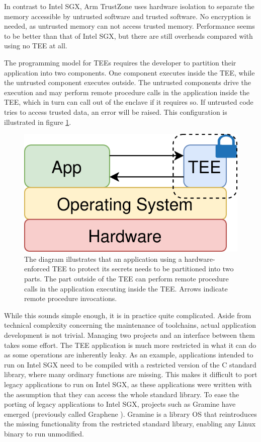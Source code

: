 In contrast to Intel SGX, Arm TrustZone uses hardware isolation to separate the memory accessible by untrusted software and
trusted software. No encryption is needed, as untrusted memory can not access trusted memory. Performance seems to
be better than that of Intel SGX, but there are still overheads \cite{DBLP:conf/dais/AmacherS19} compared with using no TEE at all.

The programming model for TEEs requires the developer to partition their application into two components. One component
executes inside the TEE, while the untrusted component executes outside. The untrusted components drive the execution and may
perform remote procedure calls in the application inside the TEE, which in turn can call out of the enclave if it requires so.
If untrusted code tries to access trusted data, an error will be raised. This configuration is illustrated in
figure \ref{graphics:tee}.

\begin{figure}
    \centering
    \includegraphics[scale=0.2]{graphics/tee.png}
    \caption{The diagram illustrates that an application using a hardware-enforced TEE to protect its secrets needs to
    be partitioned into two parts. The part outside of the TEE can perform remote procedure calls in the application
    executing inside the TEE. Arrows indicate remote procedure invocations.}
    \label{graphics:tee}
\end{figure}

While this sounds simple enough, it is in practice quite complicated. Aside from technical complexity
concerning the maintenance of toolchains, actual application development is not trivial. Managing two projects and an
interface between them takes some effort. The TEE application is much more restricted in what it can do as some
operations are inherently leaky. As an example, applications intended to run on Intel SGX need to be compiled with a
restricted version of the C standard library, where many ordinary functions are missing. This makes it difficult to port
legacy applications to run on Intel SGX, as these applications were written with the assumption that they can access the
whole standard library. To ease the porting of legacy applications to Intel SGX, projects such as Gramine have emerged
(previously called Graphene \cite{DBLP:conf/usenix/TsaiPV17}). Gramine is a library OS that reintroduces the missing
functionality from the restricted standard library, enabling any Linux binary to run unmodified.

